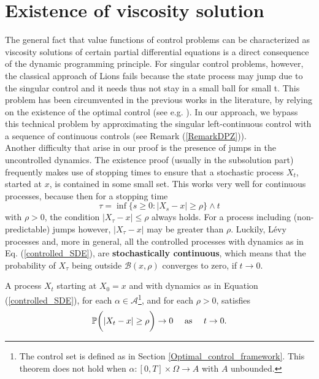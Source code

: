 








\section{Existence of viscosity solution}

The general fact that value functions of control problems can be characterized as
viscosity solutions of certain partial differential equations is a direct consequence of the dynamic
programming principle. For singular control problems, however, the classical approach of Lions
fails because the state process may jump due to the singular control and it needs thus not stay
in a small ball for small t. This problem has been circumvented in the previous works in the literature, by relying on the
existence of the optimal control (see e.g. \cite{DaPaZa93}).
In our approach, we bypass this technical problem by approximating the singular left-continuous control with a sequence of continuous controls (see Remark (\ref{RemarkDPZ})).\\ 
Another difficulty that arise in our proof is the presence of jumps in the uncontrolled dynamics.
The existence proof (usually in the subsolution part) frequently makes use of stopping times to ensure that a stochastic
process $X_t$, started at $x$, is contained in some small set. This works very well for
continuous processes, because then for a stopping time 
\begin{equation}
 \tau = \inf\{ s \geq 0 : |X_s - x| \geq \rho \} \wedge t 
\end{equation}
with $\rho >0$, the condition $|X_{\tau} - x| \leq \rho$ always holds. For a process including (non-predictable) jumps however,
$|X_{\tau} - x|$ may be greater than $\rho$. Luckily, Lévy processes and, more in general, all the controlled processes with dynamics as in Eq. (\ref{controlled_SDE}), 
are \textbf{stochastically continuous}, which
means that the probability of $X_{\tau}$ being outside $\mathcal{B}(x, \rho )$ converges to zero, if $t\to 0$.
\begin{Theorem}\label{stochastic_theorem}
 A process $X_t$ starting at $X_0=x$ and with dynamics as in Equation (\ref{controlled_SDE}), for each $ \alpha \in \mathcal{A}$\footnote{The control set is defined
 as in Section \ref{Optimal_control_framework}. This theorem does not hold when $\alpha: [0,T]\times \Omega \to A$ with $A$ unbounded.}, and for each $\rho>0$, satisfies
 \begin{equation}
   \mathbb{P} \biggl( | X_t - x | \geq \rho \biggr) \to 0 \quad \mbox{ as } \quad t\to0.
 \end{equation}
\end{Theorem}
